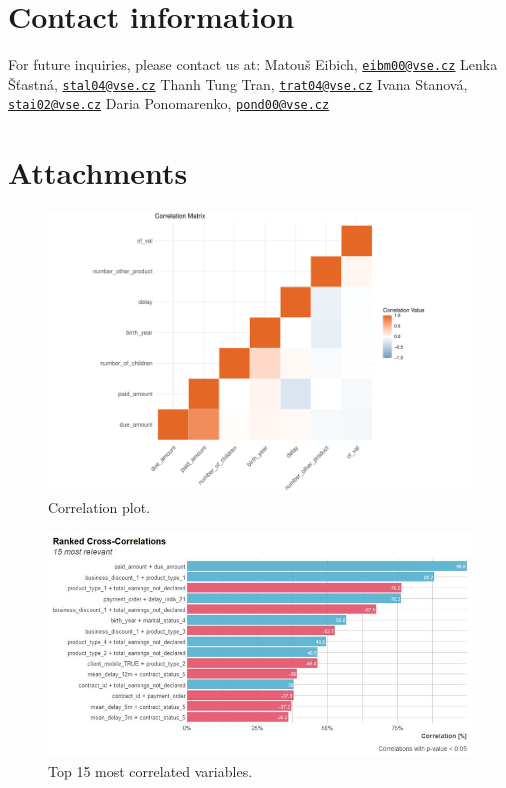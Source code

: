 \documentclass[
]{article}
\begin{document}
\hypertarget{contact-information}{%
\section{Contact information}\label{contact-information}}

For future inquiries, please contact us at:
Matouš Eibich, \href{mailto:eibm00@vse.cz}{\nolinkurl{eibm00@vse.cz}}
Lenka Šťastná, \href{mailto:stal04@vse.cz}{\nolinkurl{stal04@vse.cz}}
Thanh Tung Tran, \href{mailto:trat04@vse.cz}{\nolinkurl{trat04@vse.cz}}
Ivana Stanová, \href{mailto:stai02@vse.cz}{\nolinkurl{stai02@vse.cz}}
Daria Ponomarenko, \href{mailto:pond00@vse.cz}{\nolinkurl{pond00@vse.cz}}

\hypertarget{attachments}{%
\section{Attachments}\label{attachments}}

\begin{figure}
\centering
\includegraphics{Documentation_Rmarkdown_files/figure-latex/correlogram-1.pdf}
\caption{\label{fig:correlogram}\label{fig:correlogram}Correlation plot.}
\end{figure}

\begin{figure}
\includegraphics[width=0.9\linewidth]{top15_correlation} \caption{\label{fig:correlogramPairs} Top 15 most correlated variables. }\label{fig:correlogramPairs}
\end{figure}
\end{document}
